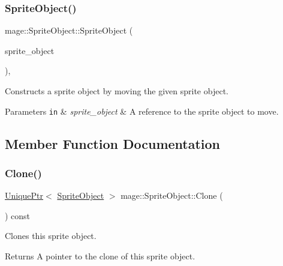 \subsubsection{\texorpdfstring{Sprite\+Object()}{SpriteObject()}\hspace{0.1cm}{\footnotesize\ttfamily [3/3]}}
{\footnotesize\ttfamily mage\+::\+Sprite\+Object\+::\+Sprite\+Object (\begin{DoxyParamCaption}\item[{\hyperlink{classmage_1_1_sprite_object}{Sprite\+Object} \&\&}]{sprite\+\_\+object }\end{DoxyParamCaption})\hspace{0.3cm}{\ttfamily [protected]}, {\ttfamily [default]}}

Constructs a sprite object by moving the given sprite object.


\begin{DoxyParams}[1]{Parameters}
\mbox{\tt in}  & {\em sprite\+\_\+object} & A reference to the sprite object to move. \\
\hline
\end{DoxyParams}


\subsection{Member Function Documentation}
\hypertarget{classmage_1_1_sprite_object_a761528ee815cbac83f9a490e07752e5c}{}\label{classmage_1_1_sprite_object_a761528ee815cbac83f9a490e07752e5c} 
\subsubsection{\texorpdfstring{Clone()}{Clone()}}
{\footnotesize\ttfamily \hyperlink{namespacemage_a3316d7143a973e37adf1110f2e80ca31}{Unique\+Ptr}$<$ \hyperlink{classmage_1_1_sprite_object}{Sprite\+Object} $>$ mage\+::\+Sprite\+Object\+::\+Clone (\begin{DoxyParamCaption}{ }\end{DoxyParamCaption}) const}

Clones this sprite object.

\begin{DoxyReturn}{Returns}
A pointer to the clone of this sprite object. 
\end{DoxyReturn}
\hypertarget{classmage_1_1_sprite_object_acbbe3d5894e5a43df411b7e5785ae174}{}\label{classmage_1_1_sprite_object_acbbe3d5894e5a43df411b7e5785ae174} 
